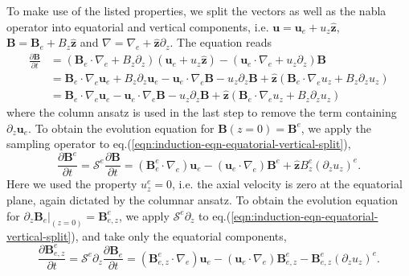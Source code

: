 To make use of the listed properties, we split the vectors as well as the nabla operator into equatorial and vertical components, i.e. $\mathbf{u} = \mathbf{u}_e + u_z \hat{\mathbf{z}}$, $\mathbf{B} = \mathbf{B}_e + B_z \hat{\mathbf{z}}$ and $\nabla = \nabla_e + \hat{\mathbf{z}} \partial_z$. The equation reads
\begin{equation}\label{eqn:induction-eqn-equatorial-vertical-split}
\begin{aligned}
    \frac{\partial \mathbf{B}}{\partial t} &= \left(\mathbf{B}_e\cdot \nabla_e + B_z \partial_z\right) \left(\mathbf{u}_e + u_z \hat{\mathbf{z}}\right) - \left(\mathbf{u}_e \cdot \nabla_e + u_z \partial_z\right) \mathbf{B} \\ 
    &= \mathbf{B}_e\cdot \nabla_e \mathbf{u}_e + B_z \partial_z \mathbf{u}_e - \mathbf{u}_e \cdot \nabla_e \mathbf{B} - u_z \partial_z \mathbf{B} + \hat{\mathbf{z}} \left(\mathbf{B}_e\cdot \nabla_e u_z + B_z \partial_z u_z \right) \\ 
    &= \mathbf{B}_e\cdot \nabla_e \mathbf{u}_e - \mathbf{u}_e \cdot \nabla_e \mathbf{B} - u_z \partial_z \mathbf{B} + \hat{\mathbf{z}} \left(\mathbf{B}_e\cdot \nabla_e u_z + B_z \partial_z u_z \right)
\end{aligned}
\end{equation}
where the column ansatz is used in the last step to remove the term containing $\partial_z \mathbf{u}_e$.
To obtain the evolution equation for $\mathbf{B}(z=0) = \mathbf{B}^e$, we apply the sampling operator to eq.(\ref{eqn:induction-eqn-equatorial-vertical-split}),
\begin{equation}
    \frac{\partial \mathbf{B}^e}{\partial t} = \mathcal{S}^e \frac{\partial \mathbf{B}}{\partial t} = \left(\mathbf{B}_e^e \cdot \nabla_e\right) \mathbf{u}_e - \left(\mathbf{u}_e\cdot \nabla_e\right) \mathbf{B}^e + \hat{\mathbf{z}} B_z^e \left(\partial_z u_z\right)^e.
\end{equation}
Here we used the property $u_z^e = 0$, i.e. the axial velocity is zero at the equatorial plane, again dictated by the columnar ansatz.
To obtain the evolution equation for $\partial_z\mathbf{B}_e|_{(z=0)} = \mathbf{B}_{e,z}^e$, we apply $\mathcal{S}^e \partial_z$ to eq.(\ref{eqn:induction-eqn-equatorial-vertical-split}), and take only the equatorial components,
\begin{equation}
    \frac{\partial \mathbf{B}_{e,z}^e}{\partial t} = \mathcal{S}^e \partial_z \frac{\partial \mathbf{B}_e}{\partial t} = \left(\mathbf{B}_{e,z}^e \cdot \nabla_e\right) \mathbf{u}_e - \left(\mathbf{u}_e\cdot \nabla_e\right) \mathbf{B}_{e,z}^e - \mathbf{B}_{e,z}^e \left(\partial_z u_z\right)^e.
\end{equation}
